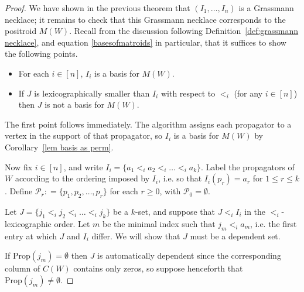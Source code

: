 \documentclass[11pt]{article}
\newcommand{\cP}{\mathcal{P}}
\newcommand{\Prop}{\textrm{Prop}}
\theoremstyle{remark}
\theoremstyle{definition}
\begin{document}
\begin{proof}
We have shown in the previous theorem that $(I_1,\dots,I_n)$ is a Grassmann necklace; it remains to check that this Grassmann necklace corresponds to the positroid $M(W)$. Recall from the discussion following Definition~\ref{def:grassmann necklace}, and equation \eqref{basesofmatroids} in particular, that it suffices to show the following points.
\begin{itemize}
\item For each $i \in [n]$, $I_i$ is a basis for $M(W)$.
\item If $J$ is lexicographically smaller than $I_i$ with respect to $<_i$ (for any $i \in [n]$) then $J$ is not a basis for $M(W)$. 
\end{itemize}
The first point follows immediately.  The algorithm assigns each propagator to a vertex in the support of that propagator, so $I_i$ is a basis for $M(W)$ by Corollary~\ref{lem basis as perm}.

Now fix $i \in [n]$, and write $I_i = \{a_1 <_i a_2 <_i \dots <_i a_k\}$. Label the propagators of $W$ according to the ordering imposed by $I_i$, i.e. so that $I_i(p_{r}) = a_{r}$ for $1 \leq r \leq k$. Define $\cP_r: = \{p_1,p_2,\dots,p_r\}$ for each $r\geq 0$, with $\cP_0 = \emptyset$.


Let $J = \{j_1 <_i j_2<_i \dots <_i j_k\}$ be a $k$-set, and suppose that $J<_i I_i$ in the $<_i$-lexicographic order. Let $m$ be the minimal index such that $j_m <_i a_m$, i.e. the first entry at which $J$ and $I_i$ differ. We will show that $J$ must be a dependent set.

If $\Prop(j_m) = \emptyset$ then $J$ is automatically dependent since the corresponding column of $C(W)$ contains only zeros, so suppose henceforth that $\Prop(j_m) \neq \emptyset$. %


\end{proof}
\end{document}
